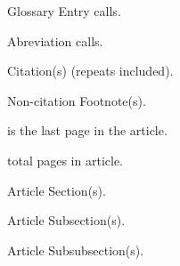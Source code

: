 {\begin{minipage}[t]{0.23\textwidth}
\begin{wrtxListMeta}[
            leftmargin=0pt,
            labelsep=0pt
            ]
            \item[\wrtxTotalCount{totalGlossaryEntriesInArticle:\wrtxarticleKeyCore}]\ Glossary Entry calls.
            \item[\wrtxTotalCount{totalAbreviationsInArticle:\wrtxarticleKeyCore}]\ Abreviation calls.
            \item[\wrtxTotalCount{totalCitationsInArticle:\wrtxarticleKeyCore}]\ Citation(s) (repeats included).
            \item[\wrtxTotalCount{totalFootnotesInArticle:\wrtxarticleKeyCore}]\ Non-citation Footnote(s).
        \end{wrtxListMeta}
    \end{minipage}
    \begin{minipage}[t]{0.33\textwidth}
        \begin{wrtxListMeta}[
            leftmargin=0pt,
            labelsep=0pt
            ]
            \item[\wrtxTotalCount{lastPageInArticle:\wrtxarticleKeyCore}]\ is the last page in the article.
            \item[%
            \wrtxListLabelStyle{%
            \totalPagesInArticleBody
            }]\ total pages in article.
            \item[\wrtxTotalCount{totalSectionsInArticle:\wrtxarticleKeyCore}]\ Article Section(s).
            \item[\wrtxTotalCount{totalSubsectionsInArticle:\wrtxarticleKeyCore}]\ Article Subsection(s).
            \item[\wrtxTotalCount{totalSubsubsectionsInArticle:\wrtxarticleKeyCore}]\ Article Subsubsection(s).
        \end{wrtxListMeta}
    \end{minipage}
}

